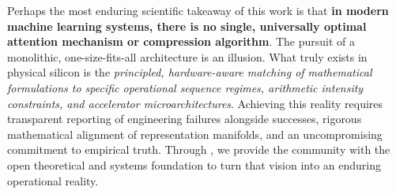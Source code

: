 Perhaps the most enduring scientific takeaway of this work is that \textbf{in modern machine learning systems, there is no single, universally optimal attention mechanism or compression algorithm}.
The pursuit of a monolithic, one-size-fits-all architecture is an illusion.
What truly exists in physical silicon is the \emph{principled, hardware-aware matching of mathematical formulations to specific operational sequence regimes, arithmetic intensity constraints, and accelerator microarchitectures}.
Achieving this reality requires transparent reporting of engineering failures alongside successes, rigorous mathematical alignment of representation manifolds, and an uncompromising commitment to empirical truth.
Through \neuralops{}, we provide the community with the open theoretical and systems foundation to turn that vision into an enduring operational reality.

